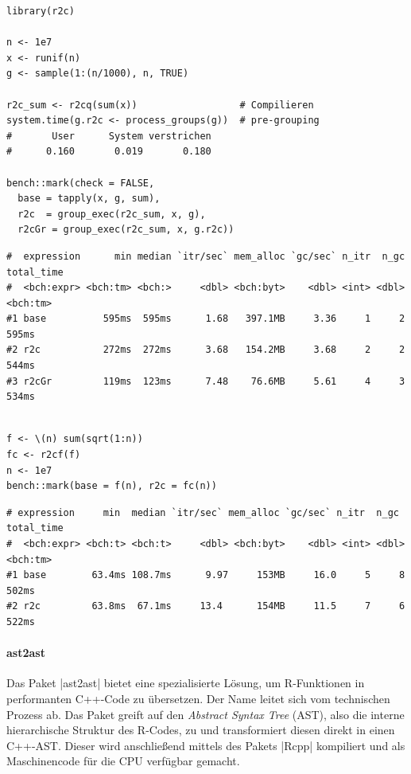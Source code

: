\documentclass[10pt,twocolumn]{scrartcl}
\renewcommand{\lstinline}{\mycoloredinline}
\begin{document}
\begin{lstlisting}
library(r2c)

n <- 1e7
x <- runif(n)
g <- sample(1:(n/1000), n, TRUE)

r2c_sum <- r2cq(sum(x))                  # Compilieren
system.time(g.r2c <- process_groups(g))  # pre-grouping
#       User      System verstrichen 
#      0.160       0.019       0.180 

bench::mark(check = FALSE,
  base = tapply(x, g, sum),
  r2c  = group_exec(r2c_sum, x, g),
  r2cGr = group_exec(r2c_sum, x, g.r2c))
\end{lstlisting}
\begin{lstlisting}[aboveskip=-2pt,basicstyle=\fontsize{7.9pt}{8.5pt}\selectfont\ttfamily]
#  expression      min median `itr/sec` mem_alloc `gc/sec` n_itr  n_gc total_time
#  <bch:expr> <bch:tm> <bch:>     <dbl> <bch:byt>    <dbl> <int> <dbl>   <bch:tm>
#1 base          595ms  595ms      1.68   397.1MB     3.36     1     2      595ms
#2 r2c           272ms  272ms      3.68   154.2MB     3.68     2     2      544ms
#3 r2cGr         119ms  123ms      7.48    76.6MB     5.61     4     3      534ms
\end{lstlisting}
\begin{lstlisting}[aboveskip=-2pt]

f <- \(n) sum(sqrt(1:n))
fc <- r2cf(f)
n <- 1e7
bench::mark(base = f(n), r2c = fc(n))
\end{lstlisting}
\begin{lstlisting}[aboveskip=-2pt,basicstyle=\fontsize{7.9pt}{8.5pt}\selectfont\ttfamily]
# expression     min  median `itr/sec` mem_alloc `gc/sec` n_itr  n_gc total_time
#  <bch:expr> <bch:t> <bch:t>     <dbl> <bch:byt>    <dbl> <int> <dbl>   <bch:tm>
#1 base        63.4ms 108.7ms      9.97     153MB     16.0     5     8      502ms
#2 r2c         63.8ms  67.1ms     13.4      154MB     11.5     7     6      522ms
\end{lstlisting}


\paragraph{ast2ast}

Das Paket \lstinline|ast2ast| bietet eine spezialisierte Lösung, um R-Funktionen in performanten C++-Code zu übersetzen. Der Name leitet sich vom technischen Prozess ab. Das Paket greift auf den \textit{Abstract Syntax Tree} (AST), also die interne hierarchische Struktur des R-Codes, zu und transformiert diesen direkt in einen C++-AST. Dieser wird anschließend mittels des Pakets \lstinline|Rcpp| kompiliert und als Maschinencode für die CPU verfügbar gemacht.
\end{document}
